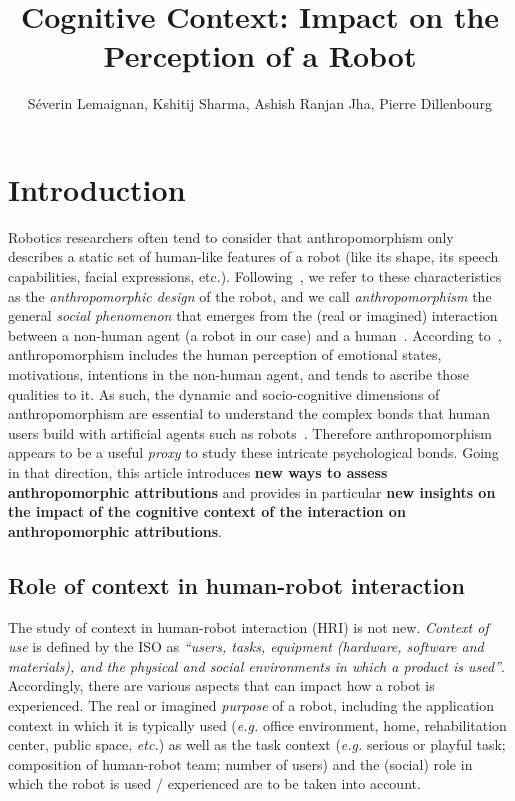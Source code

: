 \documentclass[lettersize, noapacite, twoside, HRI]{apa_HRI}
\title{Cognitive Context: Impact on the Perception of a Robot}
\author{S\'everin Lemaignan, Kshitij Sharma, Ashish Ranjan Jha, Pierre
Dillenbourg}
\affiliation{CHILI Lab, \'Ecole Polytechnique F\'ed\'erale de Lausanne}
\newcommand{\eg}{\textit{e.g.}\xspace}
\newcommand{\etc}{\textit{etc.}\xspace}
\begin{document}
\maketitle

\section{Introduction}

Robotics researchers often tend to consider that anthropomorphism only describes
a static set of human-like features of a robot (like its shape, its speech
capabilities, facial expressions, etc.).
Following~\citet{fink_anthropomorphism_2012}, we refer to these characteristics
as the \emph{anthropomorphic design} of the robot, and we call
\emph{anthropomorphism} the general \emph{social phenomenon} that emerges from
the (real or imagined) interaction between a non-human agent (a robot in our
case) and a human~\citep{persson_anthropomorphism_2000}.  According
to~\citet{epley_when_2008}, anthropomorphism includes the human perception of
emotional states, motivations, intentions in the non-human agent, and tends to
ascribe those qualities to it. As such, the dynamic and socio-cognitive
dimensions of anthropomorphism are essential to understand the complex bonds
that human users build with artificial agents such as
robots~\citep{lemaignan2014dynamics}. Therefore anthropomorphism appears to be a
useful \emph{proxy} to study these intricate psychological
bonds. Going in that direction, this article introduces \textbf{new ways to assess
anthropomorphic attributions} and provides in particular \textbf{new insights on
the impact of the cognitive context of the interaction on anthropomorphic
attributions}.

\subsection{Role of context in human-robot interaction}

The study of context in human-robot interaction (HRI) is not new.
\textit{Context of use} is defined by the ISO as \textit{``users, tasks,
equipment (hardware, software and materials), and the physical and social
environments in which a product is used''}.  Accordingly, there are various
aspects that can impact how a robot is experienced. The real or imagined
\textit{purpose} of a robot, including the application context in which it is
typically used (\eg office environment, home, rehabilitation center, public
space, \etc) as well as the task context (\eg serious or playful task;
composition of human-robot team; number of users) and the (social) role in which
the robot is used / experienced are to be taken into account.
\end{document}
